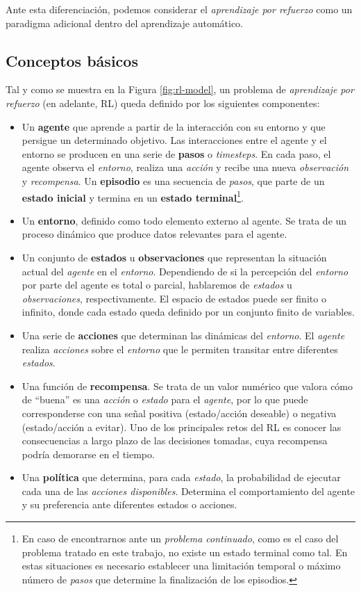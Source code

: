 Ante esta diferenciación, podemos considerar el \textit{aprendizaje por refuerzo} como un paradigma adicional dentro del aprendizaje automático.

\subsection{Conceptos básicos}

Tal y como se muestra en la Figura \ref{fig:rl-model}, un problema de \textit{aprendizaje por refuerzo} (en adelante, RL) queda definido por los siguientes componentes:

\begin{itemize}
    \item Un \textbf{agente} que aprende a partir de la interacción con su entorno y que persigue un determinado objetivo. Las interacciones entre el agente y el entorno se producen en una serie de \textbf{pasos} o \textit{timesteps}. En cada paso, el agente observa el \textit{entorno}, realiza una \textit{acción} y recibe una nueva \textit{observación} y \textit{recompensa}. Un \textbf{episodio} es una secuencia de \textit{pasos}, que parte de un \textbf{estado inicial} y termina en un \textbf{estado terminal}\footnote{En caso de encontrarnos ante un \textit{problema continuado}, como es el caso del problema tratado en este trabajo, no existe un estado terminal como tal. En estas situaciones es necesario establecer una limitación temporal o máximo número de \textit{pasos} que determine la finalización de los episodios.}.
    \item Un \textbf{entorno}, definido como todo elemento externo al agente. Se trata de un proceso dinámico que produce datos relevantes para el agente.
    \item Un conjunto de \textbf{estados} u \textbf{observaciones} que representan la situación actual del \textit{agente} en el \textit{entorno}. Dependiendo de si la percepción del \textit{entorno} por parte del agente es total o parcial, hablaremos de \textit{estados} u \textit{observaciones}, respectivamente. El espacio de estados puede ser finito o infinito, donde cada estado queda definido por un conjunto finito de variables.
    \item Una serie de \textbf{acciones} que determinan las dinámicas del \textit{entorno}. El \textit{agente} realiza \textit{acciones} sobre el \textit{entorno} que le permiten transitar entre diferentes \textit{estados}.
    \item Una función de \textbf{recompensa}. Se trata de un valor numérico que valora cómo de ``buena'' es una \textit{acción} o \textit{estado} para el \textit{agente}, por lo que puede corresponderse con una señal positiva (estado/acción deseable) o negativa (estado/acción a evitar). Uno de los principales retos del RL es conocer las consecuencias a largo plazo de las decisiones tomadas, cuya recompensa podría demorarse en el tiempo.
    \item Una \textbf{política} que determina, para cada \textit{estado}, la probabilidad de ejecutar cada una de las \textit{acciones disponibles}. Determina el comportamiento del agente y su preferencia ante diferentes estados o acciones.
\end{itemize}

